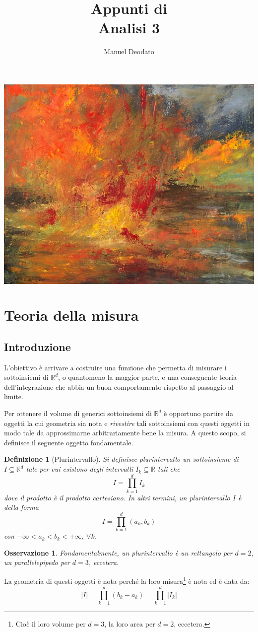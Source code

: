 \documentclass[11pt]{article}
\title{Appunti di\\ \vspace{.3cm} Analisi 3}
\author{Manuel Deodato}
\date{}
\theoremstyle{style}
\newtheorem{definizione}{Definizione}[section]
\newtheorem{osservazione}{Osservazione}[section]
\renewcommand{\maketitle}{
\begin{center}
{\sffamily
{\fontsize{20}{20}\selectfont\MakeUppercase{\thetitle}}}

\vspace{0.2in}

{\large\MakeUppercase{\theauthor}}
\end{center}
}
\numberwithin{equation}{subsection}
\begin{document}
\maketitle
\vspace{5cm}
\begin{center}
		\includegraphics[width=.9\columnwidth]{front.jpg}
\end{center}
\newpage
\tableofcontents
\newpage
\section{Teoria della misura}
\subsection{Introduzione}
	L'obiettivo \`e arrivare a costruire una funzione che permetta di misurare i sottoinsiemi di $\mathbb{R}^d$, o quantomeno la maggior parte, e una conseguente teoria dell'integrazione che abbia un buon comportamento rispetto al passaggio al limite.

	Per ottenere il volume di generici sottoinsiemi di $\mathbb{R}^d$ \`e opportuno partire da oggetti la cui geometria sia nota e \textit{rivestire} tali sottoinsiemi con questi oggetti in modo tale da approssimarne arbitrariamente bene la misura.
	A questo scopo, si definisce il seguente oggetto fondamentale.
	\begin{definizione}
		[Plurintervallo]
	Si definisce \textit{plurintervallo} un sottoinsieme di $I \subseteq \mathbb{R}^d$ tale per cui esistono degli intervalli $I_k \subseteq \mathbb{R}$ tali che
	\[
	I = \prod_{k=1} ^d I_k
	\] 
	dove il prodotto \`e il prodotto cartesiano.
	In altri termini, un plurintervallo $I$ \`e della forma
	\[
	I = \prod_{k=1} ^d (a_k,b_k)
	\] 
	con $-\infty < a_k < b_k <+\infty, \ \forall k$.
	\end{definizione}
	\begin{osservazione}
	Fondamentalmente, un plurintervallo \`e un rettangolo per $d=2$, un parallelepipedo per $d=3$, eccetera.
	\end{osservazione}
	La geometria di questi oggetti \`e nota perch\'e la loro misura\footnote{Cio\`e il loro volume per $d=3$, la loro area per $d=2$, eccetera.} \`e nota ed \`e data da:
	\[
	\lvert I \rvert  = \prod_{k=1} ^d (b_k - a_k) = \prod_{k=1} ^d \lvert I_k \rvert 
	\] 
\end{document}
